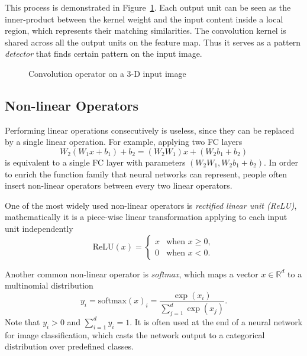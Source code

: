 This process is demonstrated in Figure~\ref{fig:dl-conv}. Each output unit can be seen as the inner-product between the kernel weight and the input content inside a local region, which represents their matching similarities. The convolution kernel is shared across all the output units on the feature map. Thus it serves as a pattern \emph{detector} that finds certain pattern on the input image.
\begin{figure}[t]
\begin{center}
\fbox{\rule{0pt}{2in} \rule{0.9\linewidth}{0pt}}
\caption{Convolution operator on a 3-D input image}
\label{fig:dl-conv}
\end{center}
\end{figure}

\subsection{Non-linear Operators} %
\label{sub:dl-nonlinops}
Performing linear operations consecutively is useless, since they can be replaced by a single linear operation. For example, applying two FC layers
\begin{equation}
  W_2(W_1x+b_1)+b_2 = (W_2W_1)x +(W_2b_1+b_2)
\end{equation}
is equivalent to a single FC layer with parameters $(W_2W_1, W_2b_1+b_2)$. In order to enrich the function family that neural networks can represent, people often insert non-linear operators between every two linear operators.

One of the most widely used non-linear operators is \emph{rectified linear unit (ReLU)}, mathematically it is a piece-wise linear transformation applying to each input unit independently
\begin{equation}
  \mathrm{ReLU}(x) = \begin{cases}
    x & \text{when }x \ge 0,\\
    0 & \text{when }x < 0.
  \end{cases}
\end{equation}

Another common non-linear operator is \emph{softmax}, which maps a vector $x\in\mathbb{R}^d$ to a multinomial distribution
\begin{equation} \label{eq:softmax}
  y_i=\mathrm{softmax}(x)_i=\frac{\exp(x_i)}{\sum_{j=1}^d \exp(x_j)}.
\end{equation}
Note that $y_i > 0$ and $\sum_{i=1}^d y_i = 1$. It is often used at the end of a neural network for image classification, which casts the network output to a categorical distribution over predefined classes.

